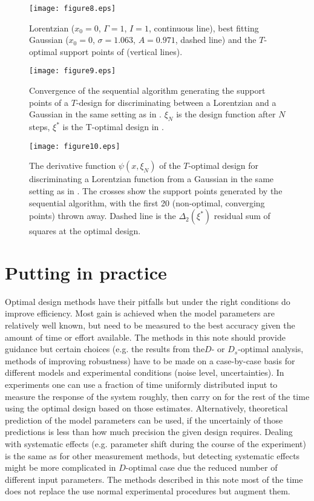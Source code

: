\documentclass[12pt]{iopart}
\begin{document}
\begin{figure}
\texttt{[image: figure8.eps]}
\caption{Lorentzian ($x_0 = 0$, $\Gamma = 1$, $I = 1$, continuous line), best fitting Gaussian ($x_0 = 0$, $\sigma = 1.063$, $A = 0.971$, dashed line) and the $T$-optimal support points of  (vertical lines).}
\label{fig:lorgauss}
\end{figure}

\begin{figure}
\texttt{[image: figure9.eps]}
\caption{Convergence of the sequential algorithm generating the support points of a $T$-design for discriminating between a Lorentzian and a Gaussian in the same setting as in . $\xi_N$ is the design function after $N$ steps, $\xi^*$ is the T-optimal design in .}
\label{fig:toptconvergence}
\end{figure}

\begin{figure}
\texttt{[image: figure10.eps]}
\caption{The derivative function $\psi(x, \xi_N)$ of the $T$-optimal design for discriminating a Lorentzian function from a Gaussian in the same setting as in . The crosses show the support points generated by the sequential algorithm, with the first 20 (non-optimal, converging points) thrown away. Dashed line is the $\Delta_2(\xi^*)$ residual sum of squares at the optimal design.}
\label{fig:topt}
\end{figure}



\section{Putting in practice}

Optimal design methods have their pitfalls but under the right conditions do improve efficiency. Most gain is achieved when the model parameters are relatively well known, but need to be measured to the best accuracy given the amount of time or effort available. The methods in this note should provide guidance but certain choices (e.g. the results from the$D$- or $D_s$-optimal analysis, methods of improving robustness) have to be made on a case-by-case basis for different models and experimental conditions (noise level, uncertainties). In experiments one can use a fraction of time uniformly distributed input to measure the response of the system roughly, then carry on for the rest of the time using the optimal design based on those estimates. Alternatively, theoretical prediction of the model parameters can be used, if the uncertainly of those predictions is less than how much precision the given design requires. Dealing with systematic effects (e.g. parameter shift during the course of the experiment) is the same as for other measurement methods, but detecting systematic effects might be more complicated in $D$-optimal case due the reduced number of different input parameters. The methods described in this note most of the time does not replace the use normal experimental procedures but augment them.
\end{document}
